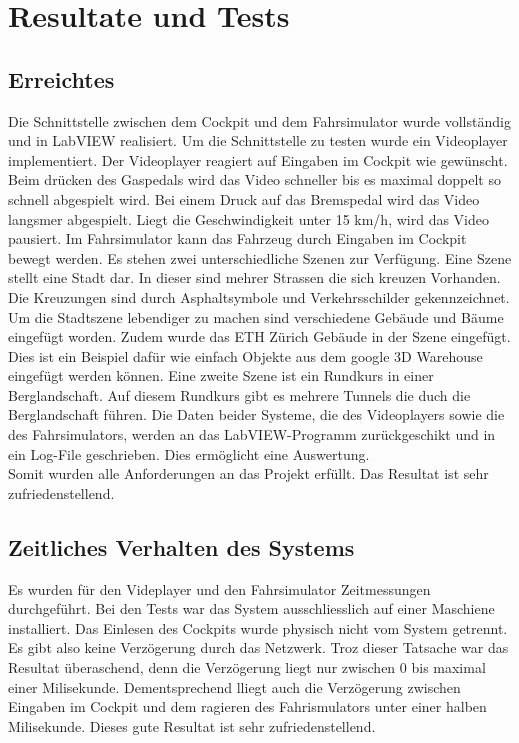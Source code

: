 \section{Resultate und Tests}
\subsection{Erreichtes}
Die Schnittstelle zwischen dem Cockpit und dem Fahrsimulator wurde vollständig und in LabVIEW realisiert. Um die Schnittstelle zu testen wurde ein Videoplayer implementiert. Der Videoplayer reagiert auf Eingaben im Cockpit wie gewünscht. Beim drücken des Gaspedals wird das Video schneller bis es maximal doppelt so schnell abgespielt wird. Bei einem Druck auf das Bremspedal wird das Video langsmer abgespielt. Liegt die Geschwindigkeit unter 15 km/h, wird das Video pausiert. Im Fahrsimulator kann das Fahrzeug durch Eingaben im Cockpit bewegt werden. Es stehen zwei unterschiedliche Szenen zur Verfügung. Eine Szene stellt eine Stadt dar. In dieser sind mehrer Strassen die sich kreuzen Vorhanden. Die Kreuzungen sind durch Asphaltsymbole und Verkehrsschilder gekennzeichnet. Um die Stadtszene lebendiger zu machen sind verschiedene Gebäude und Bäume eingefügt worden. Zudem wurde das ETH Zürich Gebäude in der Szene eingefügt. Dies ist ein Beispiel dafür wie einfach Objekte aus dem google 3D Warehouse eingefügt werden können. Eine zweite Szene ist ein Rundkurs in einer Berglandschaft. Auf diesem Rundkurs gibt es mehrere Tunnels die duch die Berglandschaft führen. 
Die Daten beider Systeme, die des Videoplayers sowie die des Fahrsimulators, werden an das LabVIEW-Programm zurückgeschikt und in ein Log-File geschrieben. Dies ermöglicht eine Auswertung.\\
Somit wurden alle Anforderungen an das Projekt erfüllt. Das Resultat ist sehr zufriedenstellend. 
\subsection{Zeitliches Verhalten des Systems}
Es wurden für den Videplayer und den Fahrsimulator Zeitmessungen durchgeführt. Bei den Tests war das System ausschliesslich auf einer Maschiene installiert. Das Einlesen des Cockpits wurde physisch nicht vom System getrennt. Es gibt also keine Verzögerung durch das Netzwerk. Troz dieser Tatsache war das Resultat überaschend, denn die Verzögerung liegt nur zwischen 0 bis maximal einer Milisekunde. Dementsprechend lliegt auch die Verzögerung zwischen Eingaben im Cockpit und dem ragieren des Fahrismulators unter einer halben Milisekunde. Dieses gute Resultat ist sehr zufriedenstellend. 
